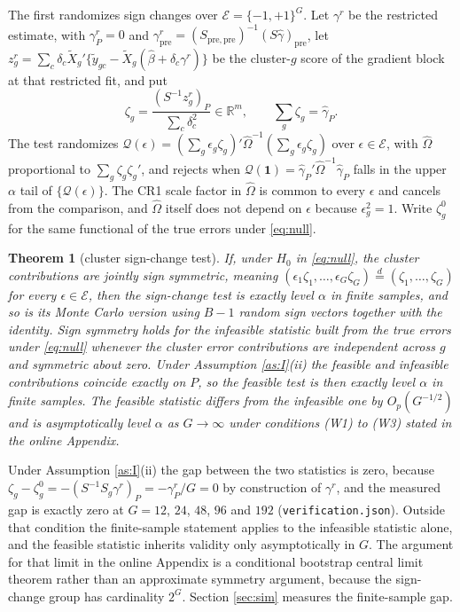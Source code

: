 \documentclass[12pt]{article}
\newtheorem{theorem}{Theorem}
\theoremstyle{definition}
\numberwithin{equation}{section}
\begin{document}
The first randomizes sign changes over $\mathcal{E} = \{-1,+1\}^G$. Let
$\gamma^r$ be the restricted estimate, with $\gamma^r_P = 0$ and
$\gamma^r_{\mathrm{pre}} = (S_{\mathrm{pre},\mathrm{pre}})^{-1}
(S\hat{\gamma})_{\mathrm{pre}}$, let $z^r_g = \sum_c \delta_c \tilde{X}_g'
\{\tilde{y}_{gc} - \tilde{X}_g(\hat{\beta} + \delta_c \gamma^r)\}$ be the
cluster-$g$ score of the gradient block at that restricted fit, and put
\begin{equation}
\zeta_g = \frac{(S^{-1}z^r_g)_P}{\sum_c \delta_c^2} \in \mathbb{R}^m ,
\qquad \sum_g \zeta_g = \hat{\gamma}_P .
\label{eq:zeta}
\end{equation}
The test randomizes $\mathcal{Q}(\epsilon) = (\sum_g \epsilon_g \zeta_g)'
\hat{\Omega}^{-1}(\sum_g \epsilon_g \zeta_g)$ over $\epsilon \in \mathcal{E}$,
with $\hat{\Omega}$ proportional to $\sum_g \zeta_g\zeta_g'$, and rejects when
$\mathcal{Q}(\mathbf{1}) = \hat{\gamma}_P'\hat{\Omega}^{-1}\hat{\gamma}_P$ falls
in the upper $\alpha$ tail of $\{\mathcal{Q}(\epsilon)\}$. The CR1 scale factor
in $\hat{\Omega}$ is common to every $\epsilon$ and cancels from the comparison,
and $\hat{\Omega}$ itself does not depend on $\epsilon$ because
$\epsilon_g^2 = 1$. Write $\zeta^0_g$ for the same functional of the true errors
under \eqref{eq:null}.

\begin{theorem}[cluster sign-change test]
\label{thm:signflip}
If, under $H_0$ in \eqref{eq:null}, the cluster contributions are jointly
sign symmetric, meaning $(\epsilon_1 \zeta_1,\dots,\epsilon_G \zeta_G)
\overset{d}{=} (\zeta_1,\dots,\zeta_G)$ for every $\epsilon \in \mathcal{E}$,
then the sign-change test is exactly level $\alpha$ in finite samples, and so is
its Monte Carlo version using $B-1$ random sign vectors together with the
identity. Sign symmetry holds for the infeasible statistic built from the true
errors under \eqref{eq:null} whenever the cluster error contributions are
independent across $g$ and symmetric about zero. Under Assumption
\ref{as:I}(ii) the feasible and infeasible contributions coincide exactly on
$P$, so the feasible test is then exactly level $\alpha$ in finite samples. The feasible statistic differs
from the infeasible one by $O_p(G^{-1/2})$ and is asymptotically level $\alpha$
as $G \to \infty$ under conditions (W1) to (W3) stated in the online Appendix.
\end{theorem}

Under Assumption \ref{as:I}(ii) the gap between the two statistics is zero,
because $\zeta_g - \zeta^0_g = -(S^{-1}S_g\gamma^r)_P = -\gamma^r_P/G = 0$ by
construction of $\gamma^r$, and the measured gap is exactly zero at $G = 12$,
$24$, $48$, $96$ and $192$ (\texttt{verification.json}). Outside that condition the finite-sample statement
applies to the infeasible statistic alone, and the feasible statistic inherits
validity only asymptotically in $G$. The argument for that limit in the
online Appendix is a conditional bootstrap central limit theorem rather than an
approximate symmetry argument, because the sign-change group has cardinality
$2^G$. Section \ref{sec:sim} measures the finite-sample gap.
\end{document}
